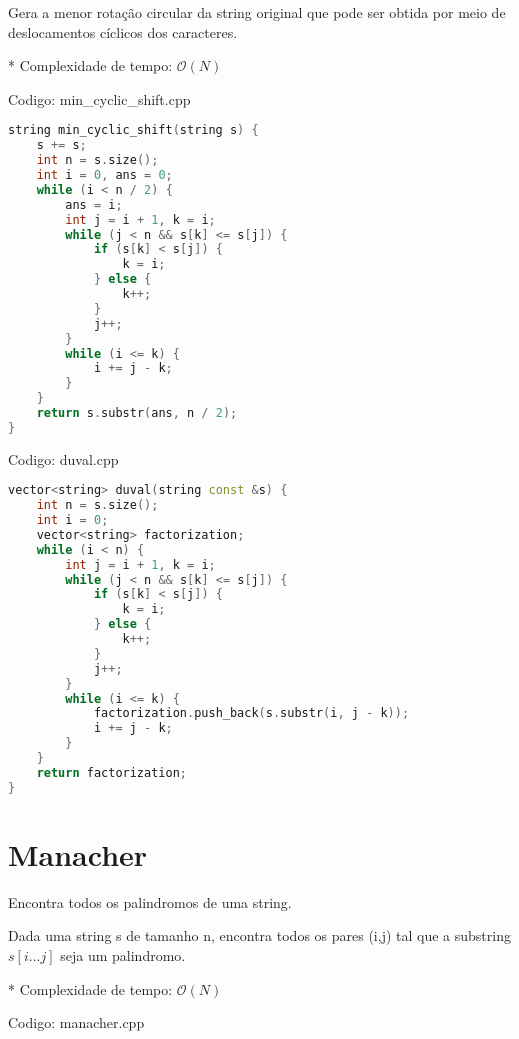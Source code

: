 \documentclass[10pt, a4paper, oneside]{book}
\begin{document}
Gera a menor rotação circular da string original que pode ser obtida por meio de deslocamentos cíclicos dos caracteres.



* Complexidade de tempo: $\mathcal{O}(N)$
\hfill

Codigo: min\_cyclic\_shift.cpp

\begin{lstlisting}[language=C++]
string min_cyclic_shift(string s) {
    s += s;
    int n = s.size();
    int i = 0, ans = 0;
    while (i < n / 2) {
        ans = i;
        int j = i + 1, k = i;
        while (j < n && s[k] <= s[j]) {
            if (s[k] < s[j]) {
                k = i;
            } else {
                k++;
            }
            j++;
        }
        while (i <= k) {
            i += j - k;
        }
    }
    return s.substr(ans, n / 2);
}
\end{lstlisting}
\hfill

Codigo: duval.cpp

\begin{lstlisting}[language=C++]
vector<string> duval(string const &s) {
    int n = s.size();
    int i = 0;
    vector<string> factorization;
    while (i < n) {
        int j = i + 1, k = i;
        while (j < n && s[k] <= s[j]) {
            if (s[k] < s[j]) {
                k = i;
            } else {
                k++;
            }
            j++;
        }
        while (i <= k) {
            factorization.push_back(s.substr(i, j - k));
            i += j - k;
        }
    }
    return factorization;
}
\end{lstlisting}
\hfill

\section{Manacher}


Encontra todos os palindromos de uma string.



Dada uma string s de tamanho n, encontra todos os pares (i,j) tal que a substring $s[i...j]$ seja um palindromo.



* Complexidade de tempo: $\mathcal{O}(N)$

\hfill

Codigo: manacher.cpp
\end{document}
